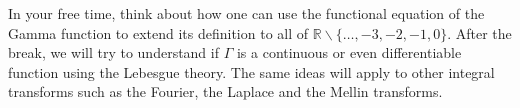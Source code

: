 \documentclass[reqno]{amsart}
\theoremstyle{plain}
\theoremstyle{definition}
\begin{document}
In your free time, think about how one can use the functional equation of the Gamma function to extend its definition to all of $\mathbb{R} \smallsetminus \{\ldots,-3, -2, -1, 0 \}$.  After the break, we will try to understand if $\Gamma$ is a continuous or even differentiable function using the Lebesgue theory.  The same ideas will apply to other integral transforms such as the Fourier, the Laplace and the Mellin transforms.
\end{document}
